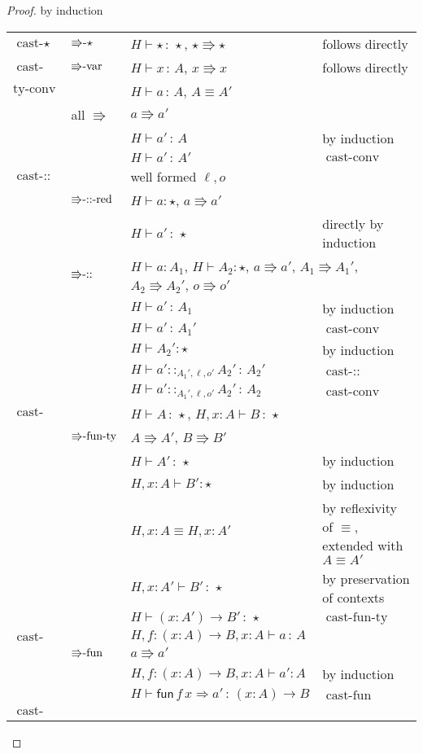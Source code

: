 \begin{proof}
by induction

\begin{tabular}{llll}
$\operatorname{cast-\star}$ & $\textrm{\ensuremath{\Rrightarrow}-}\star$ & $H\vdash\star\,:\,\star$, $\star\Rrightarrow\star$ & follows directly\tabularnewline
$\operatorname{cast-var}$ & $\textrm{\ensuremath{\Rrightarrow}-var}$ & $H\vdash x\,:\,A$, $x\Rrightarrow x$ & follows directly\tabularnewline
$\textrm{ty-conv}$ &  & $H\vdash a\,:\,A$, $A\equiv A'$ & \tabularnewline
 & all $\Rrightarrow$ & $a\Rrightarrow a'$ & \tabularnewline
 &  & $H\vdash a'\,:\,A$ & by induction\tabularnewline
 &  & $H\vdash a'\,:\,A'$ & $\operatorname{cast-conv}$\tabularnewline
$\operatorname{cast-::}$ &  & well formed $\ell,o$ & \tabularnewline
 & $\textrm{\ensuremath{\Rrightarrow}-::-red}$ & $H\vdash a:\star$, $a\Rrightarrow a'$ & \tabularnewline
 &  & $H\vdash a'\,:\,\star$ & directly by induction\tabularnewline
 & $\textrm{\ensuremath{\Rrightarrow}-::}$ & \multicolumn{2}{l}{$H\vdash a:A_{1}$, $H\vdash A_{2}:\star$, $a\Rrightarrow a'$, $A_{1}\Rrightarrow A_{1}'$,
$A_{2}\Rrightarrow A_{2}'$, $o\Rrightarrow o'$}\tabularnewline
 &  & $H\vdash a'\,:\,A_{1}$ & by induction\tabularnewline
 &  & $H\vdash a'\,:\,A_{1}'$ & $\operatorname{cast-conv}$\tabularnewline
 &  & $H\vdash A_{2}':\star$ & by induction\tabularnewline
 &  & $H\vdash a'::_{A_{1}',\ell,o'}A_{2}'\,:\,A_{2}'$ & $\operatorname{cast-::}$\tabularnewline
 &  & $H\vdash a'::_{A_{1}',\ell,o'}A_{2}'\,:\,A_{2}$ & $\operatorname{cast-conv}$\tabularnewline
$\operatorname{cast-fun-ty}$ &  & $H\vdash A\,:\,\star$, $H,x:A\vdash B\,:\,\star$ & \tabularnewline
 & $\textrm{\ensuremath{\Rrightarrow}-fun-ty}$ & $A\Rrightarrow A'$, $B\Rrightarrow B'$ & \tabularnewline
 &  & $H\vdash A'\,:\,\star$ & by induction\tabularnewline
 &  & $H,x:A\vdash B':\star$ & by induction\tabularnewline
 &  & $H,x:A\equiv H,x:A'$ & by reflexivity of $\equiv$, extended with $A\equiv A'$\tabularnewline
 &  & $H,x:A'\vdash B'\,:\,\star$ & by preservation of contexts\tabularnewline
 &  & $H\vdash\left(x:A'\right)\rightarrow B'\,:\,\star$ & $\operatorname{cast-fun-ty}$\tabularnewline
$\operatorname{cast-fun}$ &  & $H,f:\left(x:A\right)\rightarrow B,x:A\vdash a\,:\,A$ & \tabularnewline
 & $\textrm{\ensuremath{\Rrightarrow}-fun}$ & $a\Rrightarrow a'$ & \tabularnewline
 &  & $H,f:\left(x:A\right)\rightarrow B,x:A\vdash a':A$ & by induction\tabularnewline
 &  & $H\vdash\mathsf{fun}\,f\,x\Rightarrow a'\,:\,\left(x:A\right)\rightarrow B$ & $\operatorname{cast-fun}$\tabularnewline
$\operatorname{cast-fun-app}$ &  &  & \tabularnewline

\end{tabular}
\end{proof}
